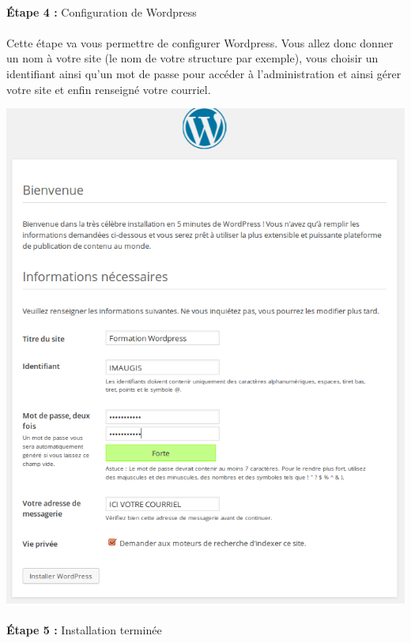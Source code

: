 \documentclass[10pt,a4paper]{article}
\begin{document}
\paragraph{}\textbf{Étape 4 : }Configuration de Wordpress
\paragraph{}Cette étape va vous permettre de configurer Wordpress. Vous allez donc donner un nom à votre site (le nom de votre structure par exemple), vous choisir un identifiant ainsi qu'un mot de passe pour accéder à l'administration et ainsi gérer votre site et enfin renseigné votre courriel.
\begin{center}
\includegraphics[scale=0.5]{img/0043.png}
\end{center}
\paragraph{}\textbf{Étape 5 : }Installation terminée
\end{document}
